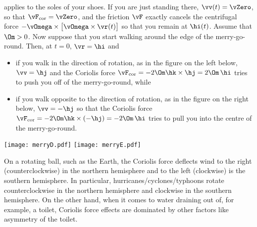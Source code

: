 applies to the soles of your shoes. If you are just standing there, 
$\vv(t)=\vZero$, so that $\vF_{{\rm cor}}=\vZero$, and the friction 
$\vF$ exactly cancels the centrifugal force 
$-\vOmega\times\big[\vOmega\times\vr(t)\big]$ 
so that you remain at $\hi(t)$. Assume that $\Om>0$. Now suppose that 
you start walking around the edge of the merry-go-round. Then, 
at $t=0$, $\vr=\hi$ and
\begin{itemize}\itemsep1pt \parskip0pt 
\item 
   if you walk in the direction of rotation, as in the figure on the 
   left below, $\vv=\hj$ and the Coriolis force $\vF_{{\rm cor}}=
   -2\Om\hk\times\hj = 2\Om\,\hi$ tries to push you off of 
   the merry-go-round, while
\item 
   if you walk opposite to the direction of rotation, as in the figure 
   on the right below,  $\vv=-\hj$ so that the Coriolis force 
   $\vF_{{\rm cor}}=-2\Om\hk\times(-\hj) = -2\Om\,\hi$ tries to pull you
   into the centre of the merry-go-round.
\end{itemize}
      \begin{efig} 
      \begin{center}
      \texttt{[image: merryD.pdf]}\qquad\qquad
      \texttt{[image: merryE.pdf]}
      \end{center}
      \end{efig}
On a rotating ball, such as the Earth, the Coriolis force deflects
wind to the right (counterclockwise) in the northern hemisphere
and to the left (clockwise) is the southern hemisphere. In particular,
hurricanes/cyclones/typhoons rotate counterclockwise in the northern
hemisphere and clockwise in the southern hemisphere. On the other
hand, when it comes to water draining out of, for example, a toilet,
Coriolis force effects are dominated by other factors like asymmetry 
of the toilet. 



